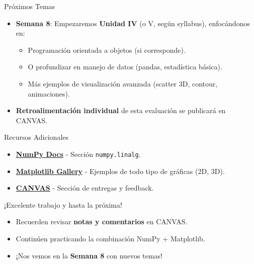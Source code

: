 \documentclass[10pt]{beamer}
\begin{document}
\begin{frame}{Próximos Temas}
  \begin{itemize}
    \item \textbf{Semana 8}: Empezaremos \textbf{Unidad IV} (o V, según syllabus), enfocándonos en:
      \begin{itemize}
        \item Programación orientada a objetos (si corresponde).
        \item O profundizar en manejo de datos (pandas, estadística básica).
        \item Más ejemplos de visualización avanzada (scatter 3D, contour, animaciones).
      \end{itemize}
    \item \textbf{Retroalimentación individual} de esta evaluación se publicará en CANVAS.
  \end{itemize}
\end{frame}

\begin{frame}{Recursos Adicionales}
  \begin{itemize}
    \item \href{https://numpy.org/doc/}{\textbf{NumPy Docs}} - Sección \texttt{numpy.linalg}.
    \item \href{https://matplotlib.org/3.1.1/gallery/index.html}{\textbf{Matplotlib Gallery}} - Ejemplos de todo tipo de gráficas (2D, 3D).
    \item \href{https://canvas.instructure.com/}{\textbf{CANVAS}} - Sección de entregas y feedback.
  \end{itemize}
\end{frame}

\begin{frame}
  \Huge{\centerline{¡Excelente trabajo y hasta la próxima!}}
  \vspace{0.5cm}
  \normalsize
  \begin{itemize}
    \item Recuerden revisar \textbf{notas y comentarios} en CANVAS.
    \item Continúen practicando la combinación NumPy + Matplotlib.
    \item ¡Nos vemos en la \textbf{Semana 8} con nuevos temas!
  \end{itemize}
\end{frame}
\end{document}
